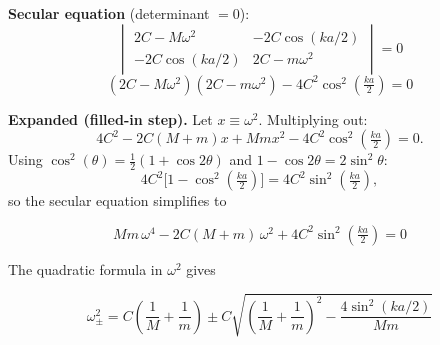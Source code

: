 \documentclass[11pt,a4paper]{article}
\begin{document}
\textbf{Secular equation} (determinant $=0$):
\[
\begin{vmatrix} 2C-M\omega^2 & -2C\cos(ka/2)\\[2pt] -2C\cos(ka/2) & 2C-m\omega^2\end{vmatrix}=0
\]
\[
(2C-M\omega^2)(2C-m\omega^2) - 4C^2\cos^2\!\left(\tfrac{ka}{2}\right)=0
\]

\textbf{Expanded (filled-in step).} Let $x\equiv\omega^2$. Multiplying out:
\[
4C^2 - 2C(M+m)x + Mm x^2 - 4C^2\cos^2\!\left(\tfrac{ka}{2}\right) = 0.
\]
Using $\cos^2(\theta)=\tfrac12(1+\cos 2\theta)$ and $1-\cos 2\theta = 2\sin^2\theta$:
\[
4C^2\bigl[1-\cos^2(\tfrac{ka}{2})\bigr] = 4C^2\sin^2(\tfrac{ka}{2}),
\]
so the secular equation simplifies to
\begin{keybox}
\[
Mm\,\omega^4 - 2C(M+m)\,\omega^2 + 4C^2\sin^2\!\left(\tfrac{ka}{2}\right)=0
\]
\end{keybox}

The quadratic formula in $\omega^2$ gives
\begin{keybox}
\[
\omega_\pm^2 = C\left(\frac1M+\frac1m\right) \pm C\sqrt{\left(\frac1M+\frac1m\right)^2 - \frac{4\sin^2(ka/2)}{Mm}}
\]
\end{keybox}
\end{document}

